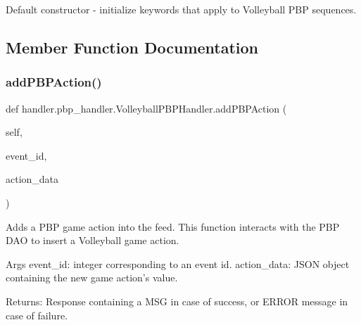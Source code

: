 \begin{DoxyVerb}Default constructor - initialize keywords that apply to Volleyball PBP sequences.
\end{DoxyVerb}
 

\subsection{Member Function Documentation}
\mbox{\label{classhandler_1_1pbp__handler_1_1_volleyball_p_b_p_handler_a10b7b1b4d77c4735a0d122cdc9ff9ced}} 
\subsubsection{\texorpdfstring{add\+P\+B\+P\+Action()}{addPBPAction()}}
{\footnotesize\ttfamily def handler.\+pbp\+\_\+handler.\+Volleyball\+P\+B\+P\+Handler.\+add\+P\+B\+P\+Action (\begin{DoxyParamCaption}\item[{}]{self,  }\item[{}]{event\+\_\+id,  }\item[{}]{action\+\_\+data }\end{DoxyParamCaption})}

\begin{DoxyVerb}Adds a PBP game action into the feed.
This function interacts with the PBP DAO to insert a Volleyball game action.

Args
    event_id: integer corresponding to an event id.
    action_data: JSON object containing the new game action's value.

Returns:
    Response containing a MSG in case of success, or ERROR message in case of failure.
\end{DoxyVerb}
 \mbox{\label{classhandler_1_1pbp__handler_1_1_volleyball_p_b_p_handler_aa611d81a64cef940be80bf1a7e942925}} 
